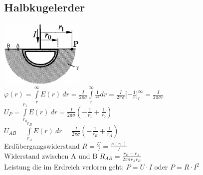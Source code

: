 \subsection{Halbkugelerder}
\begin{multicols}{2}
\includegraphics[width=0.3\textwidth]{pics/stroemungsfeld/halbkugelerder}\\
$ \varphi (r) = \int\limits_r^{\infty} E(r)\ dr = \frac{I}{2 \pi \sigma} \int\limits_r^{\infty} \frac{1}{r^2} dr = \frac{I}{2 \pi \sigma} \lbrack - \frac{1}{r} \rbrack_r^{\infty} = \frac{I}{2 \pi \sigma r}$ \\
$ U_P = \int\limits_{r_0}^{r_1} E(r)\ dr = \frac{I}{2 \pi \sigma}(-\frac{1}{r_1} + \frac{1}{r_0}) $\\
$ U_{AB} = \int\limits_{r_A}^{r_B} E(r)\ dr = \frac{I}{2 \pi \sigma}(-\frac{1}{r_B} + \frac{1}{r_A}) $ \\
Erdübergangswiderstand $ R = \frac{U}{I} = \frac{\varphi(r_0)}{I} $ \\
Widerstand zwischen A und B $ R_{AB} = \frac{r_B - r_A}{2 \pi \sigma r_A r_B} $ \\
Leistung die im Erdreich verloren geht: $ P = U \cdot I $ oder $ P = R \cdot I^2$ \\
\end{multicols}

